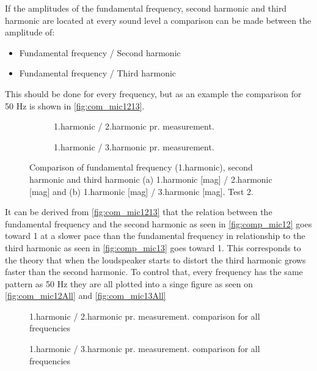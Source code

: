 If the amplitudes of the fundamental frequency, second harmonic and third harmonic are located at every sound level a comparison can be made between the amplitude of:
\begin{itemize}
\item Fundamental frequency / Second harmonic
\item Fundamental frequency / Third harmonic
\end{itemize}
This should be done for every frequency, but as an example the comparison for 50 Hz is shown in \autoref{fig:com_mic1213}.

\begin{figure}[H]
\centering
\begin{subfigure}[t]{0.45\textwidth}
    
    \caption{1.harmonic / 2.harmonic pr. measurement.}
    \label{fig:comp_mic12}
\end{subfigure}
\begin{subfigure}[t]{0.45\textwidth}
    
    \caption{1.harmonic / 3.harmonic pr. measurement.}
    \label{fig:comp_mic13}
\end{subfigure}
\caption{Comparison of fundamental frequency (1.harmonic), second harmonic and third harmonic (a) 1.harmonic [mag] / 2.harmonic [mag] and (b) 1.harmonic [mag] / 3.harmonic [mag]. Test 2.}
\label{fig:com_mic1213}
\end{figure}   

It can be derived from \autoref{fig:com_mic1213} that the relation between the fundamental frequency and the second harmonic as seen in \autoref{fig:comp_mic12} goes toward 1 at a slower pace than the fundamental frequency in relationship to the third harmonic as seen in \autoref{fig:comp_mic13} goes toward 1. This corresponds to the theory that when the loudspeaker starts to distort the third harmonic grows faster than the second harmonic. To control that, every frequency has the same pattern as 50 Hz they are all plotted into a singe figure as seen on \autoref{fig:com_mic12All} and \autoref{fig:com_mic13All}

\begin{figure}[H]
    \centering
    
    \caption{1.harmonic / 2.harmonic pr. measurement. comparison for all frequencies}
\label{fig:com_mic12All}
\end{figure}   
\begin{figure}[H]
    \centering
    
    \caption{1.harmonic / 3.harmonic pr. measurement. comparison for all frequencies}
\label{fig:com_mic13All}
\end{figure}  

